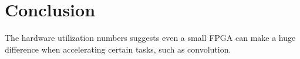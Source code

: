 \section{Conclusion}
The hardware utilization numbers suggests even a small FPGA can make a huge difference when accelerating certain tasks, such as convolution.
